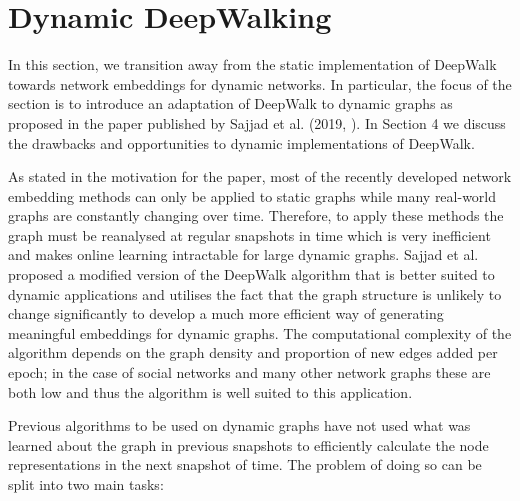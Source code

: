 \documentclass[a4paper]{article}
\begin{document}
\section{Dynamic DeepWalking}
In this section, we transition away from the static implementation of DeepWalk
towards network embeddings for dynamic networks. In particular, the focus of the
section is to introduce an adaptation of DeepWalk to dynamic graphs as
proposed in the paper published by Sajjad et al. (2019, \cite{sajjad2019}). In Section 4
we discuss the drawbacks and opportunities to dynamic implementations of DeepWalk.

As stated in the motivation for the paper, most of the recently developed
network embedding methods can only be applied to static graphs while many
real-world graphs are constantly changing over time. Therefore, to apply these
methods the graph must be reanalysed at regular snapshots in time which is very inefficient and makes
online learning intractable for large dynamic graphs. Sajjad et al. proposed a modified version of the DeepWalk
algorithm that is better suited to dynamic applications and utilises the fact that the
graph structure is unlikely to change significantly to develop a much more
efficient way of generating meaningful embeddings for dynamic graphs.
The computational complexity of the algorithm depends on the graph density and
proportion of new edges added per epoch; in the case of social networks and many other network graphs these
are both low and thus the algorithm is well suited to this application.

Previous algorithms to be used on dynamic graphs have not used what
was learned about the graph in previous snapshots to efficiently calculate the
node representations in the next snapshot of time. The problem of doing so can
be split into two main tasks:
\end{document}
